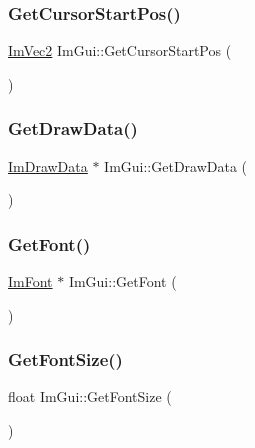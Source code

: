 \mbox{\label{namespace_im_gui_a8ee9647de3b39fc7b77395082fc9e0cc}} 
\subsubsection{\texorpdfstring{Get\+Cursor\+Start\+Pos()}{GetCursorStartPos()}}
{\footnotesize\ttfamily \mbox{\hyperlink{struct_im_vec2}{Im\+Vec2}} Im\+Gui\+::\+Get\+Cursor\+Start\+Pos (\begin{DoxyParamCaption}{ }\end{DoxyParamCaption})}

\mbox{\label{namespace_im_gui_ab73131dc44b1267dac04f0c2bb0af983}} 
\subsubsection{\texorpdfstring{Get\+Draw\+Data()}{GetDrawData()}}
{\footnotesize\ttfamily \mbox{\hyperlink{struct_im_draw_data}{Im\+Draw\+Data}} $\ast$ Im\+Gui\+::\+Get\+Draw\+Data (\begin{DoxyParamCaption}{ }\end{DoxyParamCaption})}

\mbox{\label{namespace_im_gui_a43cf349576e20fac4a1300269320ad8f}} 
\subsubsection{\texorpdfstring{Get\+Font()}{GetFont()}}
{\footnotesize\ttfamily \mbox{\hyperlink{struct_im_font}{Im\+Font}} $\ast$ Im\+Gui\+::\+Get\+Font (\begin{DoxyParamCaption}{ }\end{DoxyParamCaption})}

\mbox{\label{namespace_im_gui_ac592ae8e0aa4a1a06502ec7872bc8da8}} 
\subsubsection{\texorpdfstring{Get\+Font\+Size()}{GetFontSize()}}
{\footnotesize\ttfamily float Im\+Gui\+::\+Get\+Font\+Size (\begin{DoxyParamCaption}{ }\end{DoxyParamCaption})}

